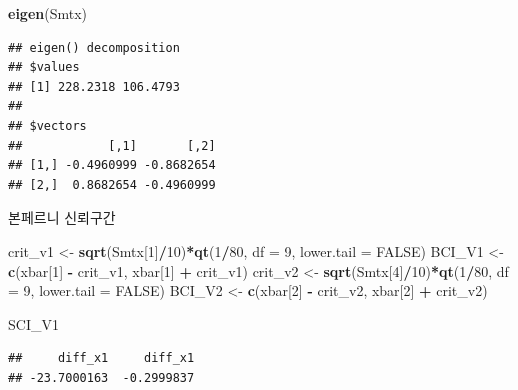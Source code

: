 \documentclass[
]{article}
\newenvironment{Shaded}{\begin{snugshade}}{\end{snugshade}}
\newcommand{\AttributeTok}[1]{\textcolor[rgb]{0.13,0.29,0.53}{#1}}
\newcommand{\ConstantTok}[1]{\textcolor[rgb]{0.56,0.35,0.01}{#1}}
\newcommand{\DecValTok}[1]{\textcolor[rgb]{0.00,0.00,0.81}{#1}}
\newcommand{\FunctionTok}[1]{\textcolor[rgb]{0.13,0.29,0.53}{\textbf{#1}}}
\newcommand{\NormalTok}[1]{#1}
\newcommand{\OtherTok}[1]{\textcolor[rgb]{0.56,0.35,0.01}{#1}}
\newcommand{\SpecialCharTok}[1]{\textcolor[rgb]{0.81,0.36,0.00}{\textbf{#1}}}
\begin{document}
\begin{Shaded}
\begin{Highlighting}[]
\FunctionTok{eigen}\NormalTok{(Smtx)}
\end{Highlighting}
\end{Shaded}

\begin{verbatim}
## eigen() decomposition
## $values
## [1] 228.2318 106.4793
## 
## $vectors
##            [,1]       [,2]
## [1,] -0.4960999 -0.8682654
## [2,]  0.8682654 -0.4960999
\end{verbatim}

본페르니 신뢰구간

\begin{Shaded}
\begin{Highlighting}[]
\NormalTok{crit\_v1 }\OtherTok{\textless{}{-}} \FunctionTok{sqrt}\NormalTok{(Smtx[}\DecValTok{1}\NormalTok{]}\SpecialCharTok{/}\DecValTok{10}\NormalTok{)}\SpecialCharTok{*}\FunctionTok{qt}\NormalTok{(}\DecValTok{1}\SpecialCharTok{/}\DecValTok{80}\NormalTok{, }\AttributeTok{df =} \DecValTok{9}\NormalTok{, }\AttributeTok{lower.tail =} \ConstantTok{FALSE}\NormalTok{)}
\NormalTok{BCI\_V1 }\OtherTok{\textless{}{-}} \FunctionTok{c}\NormalTok{(xbar[}\DecValTok{1}\NormalTok{] }\SpecialCharTok{{-}}\NormalTok{ crit\_v1, xbar[}\DecValTok{1}\NormalTok{] }\SpecialCharTok{+}\NormalTok{ crit\_v1)}
\NormalTok{crit\_v2 }\OtherTok{\textless{}{-}} \FunctionTok{sqrt}\NormalTok{(Smtx[}\DecValTok{4}\NormalTok{]}\SpecialCharTok{/}\DecValTok{10}\NormalTok{)}\SpecialCharTok{*}\FunctionTok{qt}\NormalTok{(}\DecValTok{1}\SpecialCharTok{/}\DecValTok{80}\NormalTok{, }\AttributeTok{df =} \DecValTok{9}\NormalTok{, }\AttributeTok{lower.tail =} \ConstantTok{FALSE}\NormalTok{)}
\NormalTok{BCI\_V2 }\OtherTok{\textless{}{-}} \FunctionTok{c}\NormalTok{(xbar[}\DecValTok{2}\NormalTok{] }\SpecialCharTok{{-}}\NormalTok{ crit\_v2, xbar[}\DecValTok{2}\NormalTok{] }\SpecialCharTok{+}\NormalTok{ crit\_v2)}
\end{Highlighting}
\end{Shaded}

\begin{Shaded}
\begin{Highlighting}[]
\NormalTok{SCI\_V1}
\end{Highlighting}
\end{Shaded}

\begin{verbatim}
##     diff_x1     diff_x1 
## -23.7000163  -0.2999837
\end{verbatim}
\end{document}
